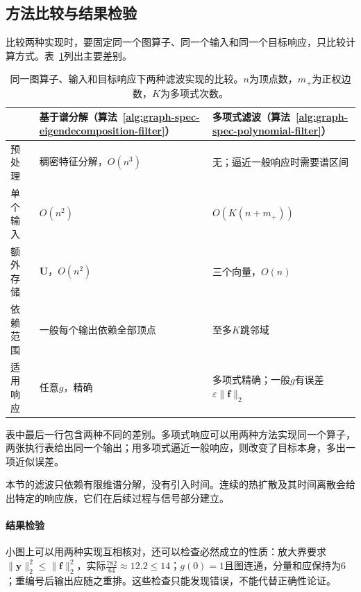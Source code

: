 \subsection{方法比较与结果检验}
\label{sec:graph-spec-filter-comparison}

比较两种实现时，要固定同一个图算子、同一个输入和同一个目标响应，只比较计算方式。表~\ref{tab:graph-spec-filter-comparison}列出主要差别。

\begin{table}[!htb]
  \centering\small
  \begin{tabularx}{\linewidth}{@{}lXX@{}}
    \toprule
    & 基于谱分解（算法~\ref{alg:graph-spec-eigendecomposition-filter}） & 多项式滤波（算法~\ref{alg:graph-spec-polynomial-filter}）\\
    \midrule
    预处理 & 稠密特征分解，$O(n^3)$ & 无；逼近一般响应时需要谱区间 \\
    单个输入 & $O(n^2)$ & $O(K(n+m_+))$ \\
    额外存储 & $\bm U$，$O(n^2)$ & 三个向量，$O(n)$ \\
    依赖范围 & 一般每个输出依赖全部顶点 & 至多$K$跳邻域 \\
    适用响应 & 任意$g$，精确 & 多项式精确；一般$g$有误差$\varepsilon\lVert\bm f\rVert_2$ \\
    \bottomrule
  \end{tabularx}
  \caption{同一图算子、输入和目标响应下两种滤波实现的比较。$n$为顶点数，$m_+$为正权边数，$K$为多项式次数。}
  \label{tab:graph-spec-filter-comparison}
\end{table}

表中最后一行包含两种不同的差别。多项式响应可以用两种方法实现同一个算子，两张执行表给出同一个输出；用多项式逼近一般响应，则改变了目标本身，多出一项近似误差。

本节的滤波只依赖有限维谱分解，没有引入时间。连续的热扩散及其时间离散会给出特定的响应族，它们在后续过程与信号部分建立。

\paragraph{结果检验}
小图上可以用两种实现互相核对，还可以检查必然成立的性质：放大界要求$\lVert\bm y\rVert_2^2\leq\lVert\bm f\rVert_2^2$，实际$\tfrac{782}{64}\approx12.2\leq14$；$g(0)=1$且图连通，分量和应保持为$6$；重编号后输出应随之重排。这些检查只能发现错误，不能代替正确性论证。
